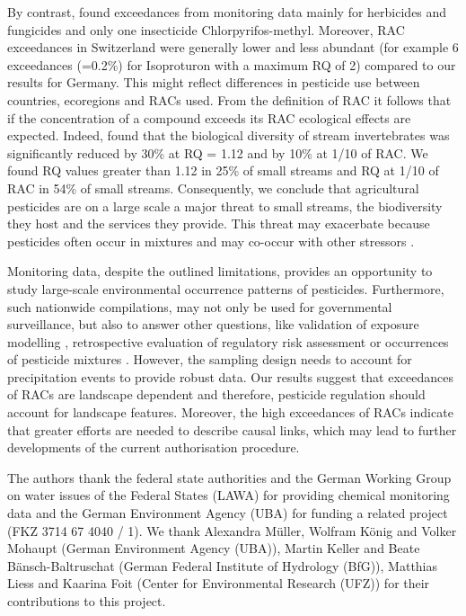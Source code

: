 \documentclass[journal=esthag,manuscript=article]{achemso}
\begin{document}
By contrast, \citet{knauer_pesticides_2016} found exceedances from monitoring data mainly for herbicides and fungicides and only one insecticide Chlorpyrifos-methyl.
Moreover, RAC exceedances in Switzerland were generally lower and less abundant (for example 6 exceedances (=0.2\%) for Isoproturon with a maximum RQ of 2) compared to our results for Germany. 
This might reflect differences in pesticide use between countries, ecoregions and RACs used. 
From the definition of RAC it follows that if the concentration of a compound exceeds its RAC ecological effects are expected.
Indeed, \citet{stehle_agricultural_2015} found that the biological diversity of stream invertebrates was significantly reduced by 30\% at RQ = 1.12 and by 10\% at 1/10 of RAC.
We found RQ values greater than 1.12 in 25\% of small streams and RQ at 1/10 of RAC in 54\% of small streams. 
Consequently, we conclude that agricultural pesticides are on a large scale a major threat to small streams, the biodiversity they host and the services they provide. 
This threat may exacerbate because pesticides often occur in mixtures \cite{schreiner_pesticide_2016} and may co-occur with other stressors \citep{schafer_contribution_2016}. 

Monitoring data, despite the outlined limitations, provides an opportunity to study large-scale environmental occurrence patterns of pesticides.
Furthermore, such nationwide compilations, may not only be used for governmental surveillance, but also to answer other questions, like validation of exposure modelling \cite{knabel_fungicide_2014}, retrospective evaluation of regulatory risk assessment \citep{knauer_pesticides_2016,stehle_pesticide_2015}or occurrences of pesticide mixtures \cite{schreiner_pesticide_2016}.
However, the sampling design needs to account for precipitation events to provide robust data. 
Our results suggest that exceedances of RACs are landscape dependent %
and therefore, pesticide regulation should account for landscape features. 
Moreover, the high exceedances of RACs indicate that greater efforts are needed to describe causal links, which may lead to further developments of the current authorisation procedure.



\begin{acknowledgement}
The authors thank the federal state authorities and the German Working Group on water issues of the Federal States (LAWA) for providing chemical monitoring data and the German Environment Agency (UBA) for funding a related project (FKZ 3714 67 4040 / 1). 
We thank Alexandra Müller, Wolfram König and Volker Mohaupt (German Environment Agency (UBA)), Martin Keller and Beate Bänsch-Baltruschat (German Federal Institute of Hydrology (BfG)), Matthias Liess and Kaarina Foit (Center for Environmental Research (UFZ)) for their contributions to this project. 
\end{acknowledgement}
\end{document}
